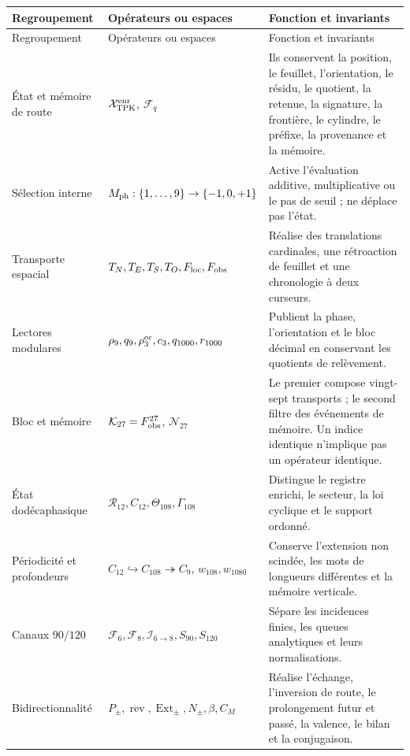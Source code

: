 \begingroup
\small
\renewcommand{\arraystretch}{1.12}
\begin{longtable}{@{}p{}p{}p{}@{}}
\toprule
Regroupement&Opérateurs ou espaces&Fonction et invariants\\
\midrule
\endfirsthead
\toprule
Regroupement&Opérateurs ou espaces&Fonction et invariants\\
\midrule
\endhead
État et mémoire de route&
\(\mathcal X_{\rm TPK}^{\rm enr}\), \(\mathcal F_q\)&
Ils conservent la position, le feuillet, l’orientation, le résidu, le quotient, la retenue, la signature,
la frontière, le cylindre, le préfixe, la provenance et la mémoire.\\

Sélection interne&
\(M_{\rm ph}:\{1,\ldots,9\}\to\{-1,0,+1\}\)&
Active l’évaluation additive, multiplicative ou le pas de seuil ; ne déplace pas
l’état.\\

Transporte espacial&
\(T_N,T_E,T_S,T_O,F_{\rm loc},F_{\rm obs}\)&
Réalise des translations cardinales, une rétroaction de feuillet et une chronologie à deux
curseurs.\\

Lectores modulares&
\(\rho_9,q_9,\rho_3^{\rm or},c_3,q_{1000},r_{1000}\)&
Publient la phase, l’orientation et le bloc décimal en conservant les quotients de
relèvement.\\

Bloc et mémoire&
\(\mathcal K_{27}=F_{\rm obs}^{27}\), \(\mathcal N_{27}\)&
Le premier compose vingt-sept transports ; le second filtre des événements de
mémoire. Un indice identique n’implique pas un opérateur identique.\\

État dodécaphasique&
\(\mathcal R_{12},C_{12},\Theta_{108},\Gamma_{108}\)&
Distingue le registre enrichi, le secteur, la loi cyclique et le support ordonné.\\

Périodicité et profondeurs&
\(C_{12}\hookrightarrow C_{108}\twoheadrightarrow C_9\),
\(w_{108},w_{1080}\)&
Conserve l’extension non scindée, les mots de longueurs différentes et
la mémoire verticale.\\

Canaux \(90/120\)&
\(\mathcal F_6,\mathcal F_8,\mathcal I_{6\to8},
S_{90},S_{120}\)&
Sépare les incidences finies, les queues analytiques et leurs normalisations.\\

Bidirectionnalité&
\(P_\pm,\operatorname{rev},\operatorname{Ext}_\pm,
N_\pm,\beta,C_M\)&
Réalise l’échange, l’inversion de route, le prolongement futur et passé,
la valence, le bilan et la conjugaison.\\


\end{longtable}
